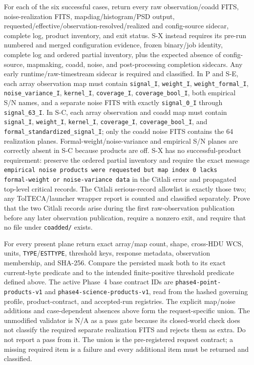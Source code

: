 \documentclass[11pt]{article}
\newcommand{\code}[1]{\nolinkurl{#1}}
\begin{document}
{\raggedright For each of the six successful cases, return every raw observation/coadd FITS,
noise-realization FITS, mapdiag/histogram/PSD output,
requested/effective/observation-resolved/realized and config-source sidecar,
complete log, product inventory, and exit status.  S-X instead requires its
pre-run numbered and merged configuration evidence, frozen binary/job identity,
complete log and ordered partial inventory, plus the expected absence of
config-source, mapmaking, coadd, noise, and post-processing completion
sidecars.  Any early runtime/raw-timestream sidecar is required and classified.
In
P and S-E, each array observation map must contain \code{signal_I},
\code{weight_I}, \code{weight_formal_I}, \code{noise_variance_I},
\code{kernel_I}, \code{coverage_I}, \code{coverage_bool_I}, both empirical S/N
names, and a separate noise FITS with exactly \code{signal_0_I} through
\code{signal_63_I}.  In S-C, each array observation and coadd map must contain
\code{signal_I}, \code{weight_I}, \code{kernel_I}, \code{coverage_I},
\code{coverage_bool_I}, and \code{formal_standardized_signal_I}; only the coadd
noise FITS contains the 64 realization planes.  Formal-weight/noise-variance
and empirical S/N planes are correctly absent in S-C because products are off.
S-X has no successful-product requirement: preserve the ordered partial
inventory and require the exact message
\code{empirical noise products were requested but map index 0 lacks
formal-weight or noise-variance data} in the Citlali error and propagated
top-level critical records.  The Citlali serious-record allowlist is exactly
those two; any TolTECA/launcher wrapper report is counted and classified
separately.  Prove that the two Citlali records arise during the first
raw-observation publication before any later observation publication, require a
nonzero exit, and require that no file under \code{coadded/} exists.\par}

{\raggedright For every present plane return exact array/map count, shape, cross-HDU WCS,
units, \code{TYPE}/\code{ESTTYPE}, threshold keys, response
metadata, observation membership, and SHA-256.  Compare the persisted mask
both to its exact current-byte predicate and to the intended finite-positive
threshold predicate defined above.  The active Phase~4
base contract IDs are \code{phase4-point-products-v1} and
\code{phase4-science-products-v1}, read from the hashed governing profile,
product-contract, and accepted-run registries.  The explicit map/noise additions and case-dependent
absences above form the request-specific union.  The unmodified validator is
N/A as a pass gate because its closed-world check does not classify the
required separate realization FITS and rejects them as extra.  Do not report a
pass from it.  The union is the pre-registered request contract; a missing
required item is a failure and every additional item must be returned and
classified.\par}
\end{document}
